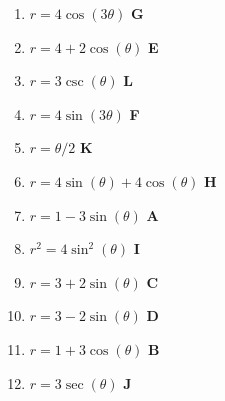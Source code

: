 \documentclass[11pt,answers]{exam}
\begin{document}
\begin{center}
\begin{tabular}{|c|c|c|}
\end{tabular}
\end{center}

\newcommand\aline[1]{\textbf{ #1 } }

\vspace{2ex}
\begin{multicols}{3}
	\begin{enumerate}
		\item $r=4\cos(3\theta)$ \aline{G}
		\item $r=4+2\cos(\theta)$ \aline{E}
		\item $r = 3\csc(\theta)$ \aline{L}
		\item $r=4\sin(3\theta)$ \aline{F}
		\item $r = \theta/2$ \aline{K}
		\item $r=4\sin(\theta)+4\cos(\theta)$ \aline{H}
		\item $r = 1-3\sin(\theta)$ \aline{A}
		\item $r^2=4\sin^2(\theta)$ \aline{I}
		\item $r = 3+2\sin(\theta)$ \aline{C}
		\item $r = 3-2\sin(\theta)$ \aline{D}
		\item $r = 1+3\cos(\theta)$ \aline{B}
		\item $r = 3\sec(\theta)$ \aline{J}
	\end{enumerate}
	\end{multicols}
\clearpage
\end{document}
